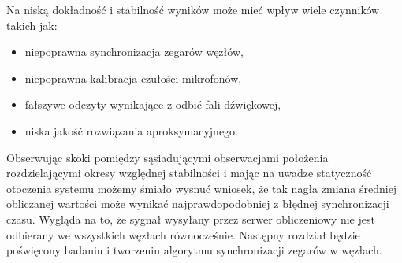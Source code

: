 Na niską dokładność i stabilność wyników może mieć wpływ wiele czynników takich jak:

\begin{itemize}
    \item niepoprawna synchronizacja zegarów węzłów,
    \item niepoprawna kalibracja czułości mikrofonów,
    \item fałszywe odczyty wynikające z odbić fali dźwiękowej,
    \item niska jakość rozwiązania aproksymacyjnego.
\end{itemize}

Obserwując skoki pomiędzy sąsiadującymi obserwacjami położenia rozdzielającymi okresy względnej stabilności i mając na uwadze statyczność otoczenia systemu możemy śmiało wysnuć wniosek, że tak nagła zmiana średniej obliczanej wartości może wynikać najprawdopodobniej z błędnej synchronizacji czasu. Wygląda na to, że sygnał wysyłany przez serwer obliczeniowy nie jest odbierany we wszystkich węzłach równocześnie. Następny rozdział będzie poświęcony badaniu i tworzeniu algorytmu synchronizacji zegarów w węzłach.